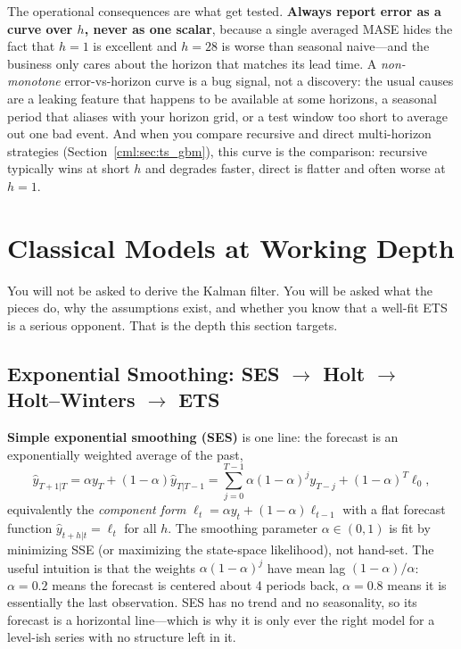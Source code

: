 The operational consequences are what get tested. \textbf{Always report error as a curve over $h$, never as one scalar}, because a single averaged MASE hides the fact that $h=1$ is excellent and $h=28$ is worse than seasonal naive---and the business only cares about the horizon that matches its lead time. A \emph{non-monotone} error-vs-horizon curve is a bug signal, not a discovery: the usual causes are a leaking feature that happens to be available at some horizons, a seasonal period that aliases with your horizon grid, or a test window too short to average out one bad event. And when you compare recursive and direct multi-horizon strategies (Section~\ref{cml:sec:ts_gbm}), this curve is the comparison: recursive typically wins at short $h$ and degrades faster, direct is flatter and often worse at $h=1$.

\section{Classical Models at Working Depth}
\label{cml:sec:ts_classical}

You will not be asked to derive the Kalman filter. You will be asked what the pieces do, why the assumptions exist, and whether you know that a well-fit ETS is a serious opponent. That is the depth this section targets.

\subsection{Exponential Smoothing: SES $\to$ Holt $\to$ Holt--Winters $\to$ ETS}

\textbf{Simple exponential smoothing (SES)} is one line: the forecast is an exponentially weighted average of the past,
\begin{equation}
\hat{y}_{T+1|T} = \alpha y_T + (1-\alpha)\hat{y}_{T|T-1} = \sum_{j=0}^{T-1}\alpha(1-\alpha)^j y_{T-j} + (1-\alpha)^T \ell_0,
\end{equation}
equivalently the \emph{component form} $\ell_t = \alpha y_t + (1-\alpha)\ell_{t-1}$ with a flat forecast function $\hat{y}_{t+h|t} = \ell_t$ for all $h$. The smoothing parameter $\alpha \in (0,1)$ is fit by minimizing SSE (or maximizing the state-space likelihood), not hand-set. The useful intuition is that the weights $\alpha(1-\alpha)^j$ have mean lag $(1-\alpha)/\alpha$: $\alpha = 0.2$ means the forecast is centered about 4 periods back, $\alpha = 0.8$ means it is essentially the last observation. SES has no trend and no seasonality, so its forecast is a horizontal line---which is why it is only ever the right model for a level-ish series with no structure left in it.

